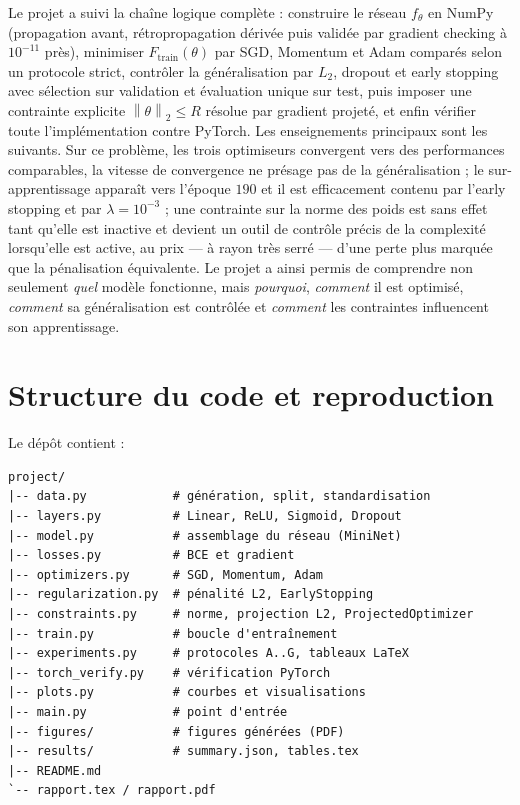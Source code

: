 \documentclass[11pt,a4paper]{article}
\newcommand{\norm}[1]{\left\lVert #1 \right\rVert}
\begin{document}
Le projet a suivi la chaîne logique complète : construire le réseau $f_\theta$ en NumPy (propagation avant, rétropropagation dérivée puis validée par gradient checking à $10^{-11}$ près), minimiser $F_{\mathrm{train}}(\theta)$ par SGD, Momentum et Adam comparés selon un protocole strict, contrôler la généralisation par $L_2$, dropout et early stopping avec sélection sur validation et évaluation unique sur test, puis imposer une contrainte explicite $\norm{\theta}_2 \le R$ résolue par gradient projeté, et enfin vérifier toute l'implémentation contre PyTorch. Les enseignements principaux sont les suivants. Sur ce problème, les trois optimiseurs convergent vers des performances comparables, la vitesse de convergence ne présage pas de la généralisation ; le sur-apprentissage apparaît vers l'époque $190$ et il est efficacement contenu par l'early stopping et par $\lambda = 10^{-3}$ ; une contrainte sur la norme des poids est sans effet tant qu'elle est inactive et devient un outil de contrôle précis de la complexité lorsqu'elle est active, au prix --- à rayon très serré --- d'une perte plus marquée que la pénalisation équivalente. Le projet a ainsi permis de comprendre non seulement \emph{quel} modèle fonctionne, mais \emph{pourquoi}, \emph{comment} il est optimisé, \emph{comment} sa généralisation est contrôlée et \emph{comment} les contraintes influencent son apprentissage.

\appendix
\section{Structure du code et reproduction}

Le dépôt contient :
\begin{verbatim}
project/
|-- data.py            # génération, split, standardisation
|-- layers.py          # Linear, ReLU, Sigmoid, Dropout
|-- model.py           # assemblage du réseau (MiniNet)
|-- losses.py          # BCE et gradient
|-- optimizers.py      # SGD, Momentum, Adam
|-- regularization.py  # pénalité L2, EarlyStopping
|-- constraints.py     # norme, projection L2, ProjectedOptimizer
|-- train.py           # boucle d'entraînement
|-- experiments.py     # protocoles A..G, tableaux LaTeX
|-- torch_verify.py    # vérification PyTorch
|-- plots.py           # courbes et visualisations
|-- main.py            # point d'entrée
|-- figures/           # figures générées (PDF)
|-- results/           # summary.json, tables.tex
|-- README.md
`-- rapport.tex / rapport.pdf
\end{verbatim}
\end{document}
